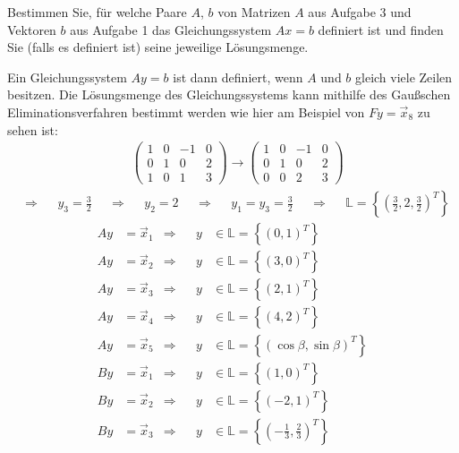 \documentclass[11pt]{exam}
\begin{document}
\begin{questions}
Bestimmen Sie, für welche Paare $A$, $b$ von Matrizen $A$ aus Aufgabe 3 und Vektoren $b$ aus Aufgabe 1 das Gleichungssystem $Ax=b$ definiert ist und finden Sie (falls es definiert ist) seine jeweilige Lösungsmenge.
\begin{solution}
	Ein Gleichungssystem $Ay=b$ ist dann definiert, wenn $A$ und $b$ gleich viele Zeilen besitzen. Die Lösungsmenge des Gleichungssystems kann mithilfe des Gaußschen Eliminationsverfahren bestimmt werden wie hier am Beispiel von $Fy=\vec{x}_8$ zu sehen ist:
	\begin{align*}
		&
		\left(\begin{array}{rrr|r}
			1 & 0 & -1 & 0\\
			0 & 1 & 0 & 2\\
			1 & 0 & 1 & 3
		\end{array} \right)
		\rightarrow
		\left(\begin{array}{rrr|r}
			1 & 0 & -1 & 0\\
			0 & 1 & 0 & 2\\
			0 & 0 & 2 & 3
		\end{array} \right)
	\end{align*}
	\begin{align*}
		&\Rightarrow&&y_3=\tfrac{3}{2}&&\Rightarrow&&y_2=2&&\Rightarrow&&y_1=y_3=\tfrac{3}{2}&&\Rightarrow&&\mathbb{L}=\left\{\left(\frac{3}{2},2,\frac{3}{2}\right)^T\right\}
	\end{align*}
	\begin{align*}
		Ay&=\vec{x}_1&\Rightarrow&&y&\in\mathbb{L}=\left\{(0,1)^T\right\}\\
		Ay&=\vec{x}_2&\Rightarrow&&y&\in\mathbb{L}=\left\{(3,0)^T\right\}\\
		Ay&=\vec{x}_3&\Rightarrow&&y&\in\mathbb{L}=\left\{(2,1)^T\right\}\\
		Ay&=\vec{x}_4&\Rightarrow&&y&\in\mathbb{L}=\left\{(4,2)^T\right\}\\
		Ay&=\vec{x}_5&\Rightarrow&&y&\in\mathbb{L}=\left\{(\cos\beta,\sin\beta)^T\right\}\\
		By&=\vec{x}_1&\Rightarrow&&y&\in\mathbb{L}=\left\{(1,0)^T\right\}\\
		By&=\vec{x}_2&\Rightarrow&&y&\in\mathbb{L}=\left\{(-2,1)^T\right\}\\
		By&=\vec{x}_3&\Rightarrow&&y&\in\mathbb{L}=\left\{\left(-\frac{1}{3},\frac{2}{3}\right)^T\right\}\\

\end{align*}
\end{solution}
\end{questions}
\end{document}
